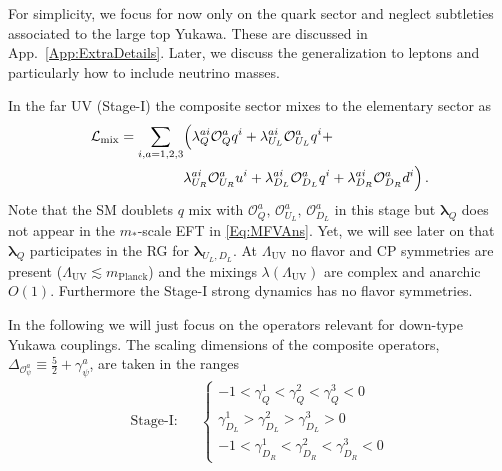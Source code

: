 \documentclass[aps,prl,twocolumn,showpacs,10pt,preprintnumbers,nofootinbib]{revtex4-2}
\newcommand{\mst}{m_*}
\newcommand{\LUV}{\Lambda_{\text{UV}}}
\newcommand{\op}{\mathcal{O}}
\begin{document}
For simplicity, we focus for now only on the quark sector and neglect subtleties associated to the large top Yukawa. These are discussed in App.~\ref{App:ExtraDetails}. Later, we discuss the generalization to leptons and particularly how to include neutrino masses.

In the far UV (Stage-I) the composite sector mixes to the elementary sector as 
\begin{align}\label{Eq:MixPhaseI}
\mathcal{L}_{\text{mix}} = \sum_{i,a=1,2,3} &\Big( \lambda_Q^{ai} \op^a_Q q^i +\lambda_{U_L}^{ai} \op_{U_L}^a q^i +\\ &\lambda_{U_R}^{ai} \op^{a}_{U_R} u^i+\lambda_{D_L}^{ai} \op^{a}_{D_L} q^i+\lambda_{D_R}^{ai} \op^{a}_{D_R} d^i\Big)\,.\notag
\end{align}
Note that the SM doublets $q$ mix with $\op_Q^a,\, \op_{U_L}^a,\,\op_{D_L}^a$ in this stage but $\boldsymbol{\lambda}_{Q}$ does not appear in the $\mst$-scale EFT in \eqref{Eq:MFVAns}. Yet, we will see later on that $\boldsymbol{\lambda}_{Q}$ participates in the RG for $\boldsymbol{\lambda}_{U_L,D_L}$.  At $\Lambda_{\text{UV}}$ no flavor and CP symmetries are present ($\LUV\lesssim m_{\text{Planck}}$) and the mixings $\lambda(\LUV)$ are complex and anarchic $O(1)$. Furthermore the Stage-I strong dynamics has no flavor symmetries. 

In the following we will just focus on the operators relevant for down-type Yukawa couplings. The scaling dimensions of the composite operators, $\Delta_{\op_{\psi}^a} \equiv \frac{5}{2}+\gamma_{\psi}^a$, are taken in the ranges
\begin{align}
    \text{Stage-I:} && \begin{cases}
        -1 < \gamma_Q^1<\gamma_Q^2<\gamma_Q^3 < 0  \\ 
        \gamma_{D_L}^1>\gamma_{D_L}^2> \gamma_{D_L}^3 > 0 \\
        -1 < \gamma_{D_R}^1<\gamma_{D_R}^2<\gamma_{D_R}^3 < 0 
    \end{cases}
\end{align}
\end{document}
